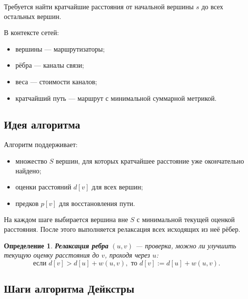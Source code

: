 \documentclass[12pt,a4paper]{article}
\newtheorem{definition}{Определение}
\begin{document}
Требуется найти кратчайшие расстояния от начальной вершины $s$ до всех остальных вершин.

В контексте сетей:
\begin{itemize}
    \item вершины --- маршрутизаторы;
    \item рёбра --- каналы связи;
    \item веса --- стоимости каналов;
    \item кратчайший путь --- маршрут с минимальной суммарной метрикой.
\end{itemize}

\subsection{Идея алгоритма}

Алгоритм поддерживает:
\begin{itemize}
    \item множество $S$ вершин, для которых кратчайшее расстояние уже окончательно найдено;
    \item оценки расстояний $d[v]$ для всех вершин;
    \item предков $p[v]$ для восстановления пути.
\end{itemize}

На каждом шаге выбирается вершина вне $S$ с минимальной текущей оценкой расстояния. После этого выполняется релаксация всех исходящих из неё рёбер.

\begin{definition}
\textbf{Релаксация ребра} $(u,v)$ --- проверка, можно ли улучшить текущую оценку расстояния до $v$, проходя через $u$:
\[
\text{если } d[v] > d[u] + w(u,v),
\text{ то } d[v] := d[u] + w(u,v).
\]
\end{definition}

\subsection{Шаги алгоритма Дейкстры}
\end{document}
